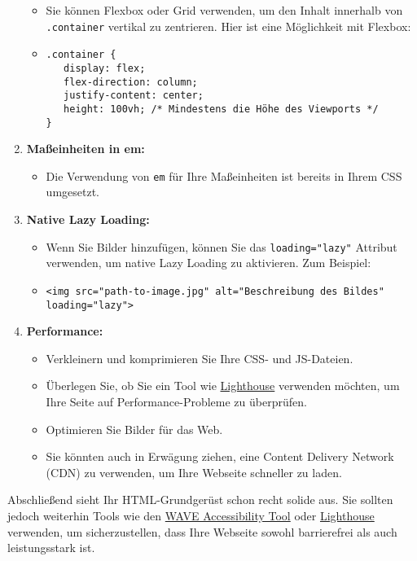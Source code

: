 \documentclass[12pt,a4paper]{scrartcl}
\newcommand{\tightlist}{
  \setlength{\itemsep}{0pt}\setlength{\parskip}{0pt}
}
\begin{document}
\begin{enumerate}
  \begin{itemize}
  \item
    Sie können Flexbox oder Grid verwenden, um den Inhalt innerhalb von
    {\lstinline!.container!} vertikal zu zentrieren. Hier
    ist eine Möglichkeit mit Flexbox:
  \item
\begin{lstlisting}
.container {
   display: flex;
   flex-direction: column;
   justify-content: center;
   height: 100vh; /* Mindestens die Höhe des Viewports */
}
\end{lstlisting}
  \end{itemize}
\item
  \textbf{Maßeinheiten in em:}

  \begin{itemize}
  \tightlist
  \item
    Die Verwendung von {\lstinline!em!} für Ihre
    Maßeinheiten ist bereits in Ihrem CSS umgesetzt.
  \end{itemize}
\item
  \textbf{Native Lazy Loading:}

  \begin{itemize}
  \tightlist
  \item
    Wenn Sie Bilder hinzufügen, können Sie das
    {\lstinline!loading="lazy"!} Attribut verwenden, um
    native Lazy Loading zu aktivieren. Zum Beispiel:
  \item
    {\lstinline!<img src="path-to-image.jpg" alt="Beschreibung des Bildes" loading="lazy">!}
  \end{itemize}
\item
  \textbf{Performance:}

  \begin{itemize}
  \tightlist
  \item
    Verkleinern und komprimieren Sie Ihre CSS- und JS-Dateien.
  \item
    Überlegen Sie, ob Sie ein Tool wie
    \href{https://developers.google.com/web/tools/lighthouse}{Lighthouse}
    verwenden möchten, um Ihre Seite auf Performance-Probleme zu
    überprüfen.
  \item
    Optimieren Sie Bilder für das Web.
  \item
    Sie könnten auch in Erwägung ziehen, eine Content Delivery Network
    (CDN) zu verwenden, um Ihre Webseite schneller zu laden.
  \end{itemize}
\end{enumerate}

Abschließend sieht Ihr HTML-Grundgerüst schon recht solide aus. Sie
sollten jedoch weiterhin Tools wie den
\href{https://wave.webaim.org/}{WAVE Accessibility Tool} oder
\href{https://developers.google.com/web/tools/lighthouse}{Lighthouse}
verwenden, um sicherzustellen, dass Ihre Webseite sowohl barrierefrei
als auch leistungsstark ist.
\end{document}
